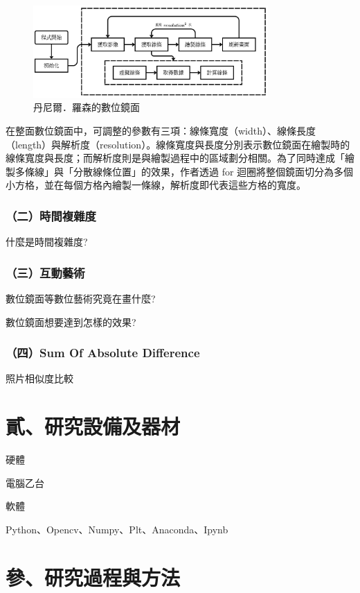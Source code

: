\documentclass[12pt]{article}
\begin{document}
\begin{figure}[htbp]
  \centering
  \includegraphics[width=0.8\textwidth]{img//program_flaw.jpg}
  \caption{丹尼爾．羅森的數位鏡面}\label{fig:program_flaw}
\end{figure}

在整面數位鏡面中，可調整的參數有三項：線條寬度（width）、線條長度（length）與解析度（resolution）。線條寬度與長度分別表示數位鏡面在繪製時的線條寬度與長度；而解析度則是與繪製過程中的區域劃分相關。為了同時達成「繪製多條線」與「分散線條位置」的效果，作者透過 for 迴圈將整個鏡面切分為多個小方格，並在每個方格內繪製一條線，解析度即代表這些方格的寬度。

\subsubsection{（二）時間複雜度}

什麼是時間複雜度?

\subsubsection{（三）互動藝術}

數位鏡面等數位藝術究竟在畫什麼?

數位鏡面想要達到怎樣的效果?

\subsubsection{（四）Sum Of Absolute Difference}

照片相似度比較

\newpage
\section{貳、研究設備及器材}

硬體

電腦乙台

軟體

Python、Opencv、Numpy、Plt、Anaconda、Ipynb

\newpage
\section{參、研究過程與方法}
\end{document}
